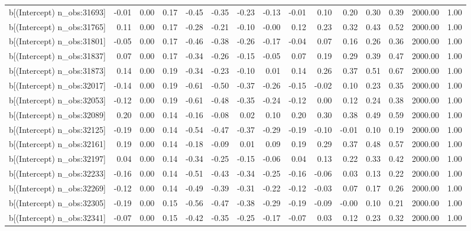 \begin{table}[ht]
\begin{tabular}{rrrrrrrrrrrrrrr}
  b[(Intercept) n\_obs:31693] & -0.01 & 0.00 & 0.17 & -0.45 & -0.35 & -0.23 & -0.13 & -0.01 & 0.10 & 0.20 & 0.30 & 0.39 & 2000.00 & 1.00 \\ 
  b[(Intercept) n\_obs:31765] & 0.11 & 0.00 & 0.17 & -0.28 & -0.21 & -0.10 & -0.00 & 0.12 & 0.23 & 0.32 & 0.43 & 0.52 & 2000.00 & 1.00 \\ 
  b[(Intercept) n\_obs:31801] & -0.05 & 0.00 & 0.17 & -0.46 & -0.38 & -0.26 & -0.17 & -0.04 & 0.07 & 0.16 & 0.26 & 0.36 & 2000.00 & 1.00 \\ 
  b[(Intercept) n\_obs:31837] & 0.07 & 0.00 & 0.17 & -0.34 & -0.26 & -0.15 & -0.05 & 0.07 & 0.19 & 0.29 & 0.39 & 0.47 & 2000.00 & 1.00 \\ 
  b[(Intercept) n\_obs:31873] & 0.14 & 0.00 & 0.19 & -0.34 & -0.23 & -0.10 & 0.01 & 0.14 & 0.26 & 0.37 & 0.51 & 0.67 & 2000.00 & 1.00 \\ 
  b[(Intercept) n\_obs:32017] & -0.14 & 0.00 & 0.19 & -0.61 & -0.50 & -0.37 & -0.26 & -0.15 & -0.02 & 0.10 & 0.23 & 0.35 & 2000.00 & 1.00 \\ 
  b[(Intercept) n\_obs:32053] & -0.12 & 0.00 & 0.19 & -0.61 & -0.48 & -0.35 & -0.24 & -0.12 & 0.00 & 0.12 & 0.24 & 0.38 & 2000.00 & 1.00 \\ 
  b[(Intercept) n\_obs:32089] & 0.20 & 0.00 & 0.14 & -0.16 & -0.08 & 0.02 & 0.10 & 0.20 & 0.30 & 0.38 & 0.49 & 0.59 & 2000.00 & 1.00 \\ 
  b[(Intercept) n\_obs:32125] & -0.19 & 0.00 & 0.14 & -0.54 & -0.47 & -0.37 & -0.29 & -0.19 & -0.10 & -0.01 & 0.10 & 0.19 & 2000.00 & 1.00 \\ 
  b[(Intercept) n\_obs:32161] & 0.19 & 0.00 & 0.14 & -0.18 & -0.09 & 0.01 & 0.09 & 0.19 & 0.29 & 0.37 & 0.48 & 0.57 & 2000.00 & 1.00 \\ 
  b[(Intercept) n\_obs:32197] & 0.04 & 0.00 & 0.14 & -0.34 & -0.25 & -0.15 & -0.06 & 0.04 & 0.13 & 0.22 & 0.33 & 0.42 & 2000.00 & 1.00 \\ 
  b[(Intercept) n\_obs:32233] & -0.16 & 0.00 & 0.14 & -0.51 & -0.43 & -0.34 & -0.25 & -0.16 & -0.06 & 0.03 & 0.13 & 0.22 & 2000.00 & 1.00 \\ 
  b[(Intercept) n\_obs:32269] & -0.12 & 0.00 & 0.14 & -0.49 & -0.39 & -0.31 & -0.22 & -0.12 & -0.03 & 0.07 & 0.17 & 0.26 & 2000.00 & 1.00 \\ 
  b[(Intercept) n\_obs:32305] & -0.19 & 0.00 & 0.15 & -0.56 & -0.47 & -0.38 & -0.29 & -0.19 & -0.09 & -0.00 & 0.10 & 0.21 & 2000.00 & 1.00 \\ 
  b[(Intercept) n\_obs:32341] & -0.07 & 0.00 & 0.15 & -0.42 & -0.35 & -0.25 & -0.17 & -0.07 & 0.03 & 0.12 & 0.23 & 0.32 & 2000.00 & 1.00 \\ 

\end{tabular}
\end{table}
